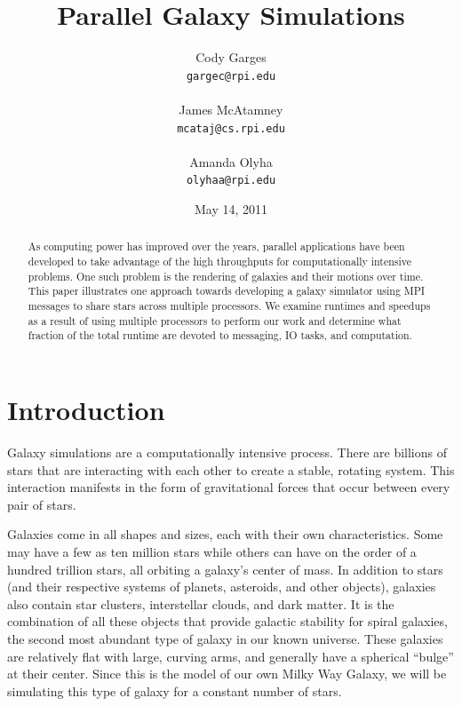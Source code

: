 \documentclass{article}
\begin{document}
\twocolumn

\title{Parallel Galaxy Simulations}

\author{Cody Garges \\ \texttt{gargec@rpi.edu} \\ \\
	James McAtamney \\ \texttt{mcataj@cs.rpi.edu} \\ \\
	Amanda Olyha \\ \texttt{olyhaa@rpi.edu} }  
\date{May 14, 2011}	
 
\maketitle


\begin{abstract}

As computing power has improved over the years, parallel applications have been developed to take advantage of the high throughputs for computationally intensive problems.  One such problem is the rendering of galaxies and their motions over time.  This paper illustrates one approach towards developing a galaxy simulator using MPI messages to share stars across multiple processors.  We examine runtimes and speedups as a result of using multiple processors to perform our work and determine what fraction of the total runtime are devoted to messaging, IO tasks, and computation.

\end{abstract}

\section{Introduction}

Galaxy simulations are a computationally intensive process.  There are billions of stars that are interacting with each other to create a stable, rotating system.  This interaction manifests in the form of gravitational forces that occur between every pair of stars. 

Galaxies come in all shapes and sizes, each with their own characteristics.  Some may have a few as ten million stars while others can have on the order of a hundred trillion stars, all orbiting a galaxy's center of mass.  In addition to stars (and their respective systems of planets, asteroids, and other objects), galaxies also contain star clusters, interstellar clouds, and dark matter.  It is the combination of all these objects that provide galactic stability for spiral galaxies, the second most abundant type of galaxy in our known universe.  These galaxies are relatively flat with large, curving arms, and generally have a spherical ``bulge'' at their center.   Since this is the model of our own Milky Way Galaxy, we will be simulating this type of galaxy for a constant number of stars.
\end{document}
